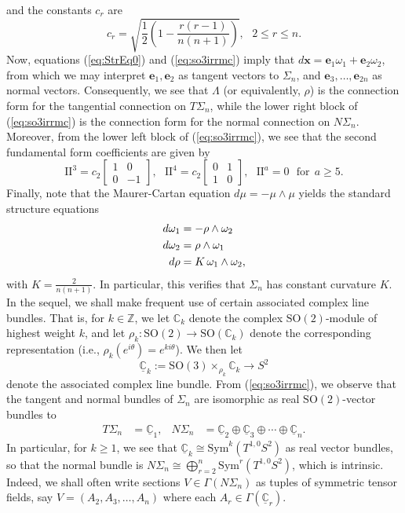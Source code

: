 \documentclass[11pt]{article}
\newcommand{\SO}{\mathrm{SO}}
\newcommand{\Sym}{\mathrm{Sym}}
\newcommand{\Z}{\mathbb{Z}}
\newcommand{\C}{\mathbb{C}}
\newcommand{\uC}{\underline{\mathbb{C}}}
\newcommand{\sff}{\mathrm{I\!I}}
\theoremstyle{definition}
\numberwithin{equation}{section}
\begin{document}
and the constants $c_r$  are
\begin{equation*}
    c_r = \sqrt{\frac{1}{2} \left( 1 - \frac{r(r-1)}{n(n+1)}  \right)}, \ \ \ 2 \leq r \leq n.
\end{equation*}
\indent Now, equations (\ref{eq:StrEq0}) and (\ref{eq:so3irrmc}) imply that $d\mathbf{x} = \mathbf{e}_1\omega_1 + \mathbf{e}_2\omega_2$, from which we may interpret $\mathbf{e}_1, \mathbf{e}_2$ as tangent vectors to $\Sigma_n$, and $\mathbf{e}_3, \ldots, \mathbf{e}_{2n}$ as normal vectors.  Consequently, we see that $\Lambda$ (or equivalently, $\rho$) is the connection form for the tangential connection on $T\Sigma_n$, while the lower right block of (\ref{eq:so3irrmc}) is the connection form for the normal connection on $N\Sigma_n$.  Moreover, from the lower left block of (\ref{eq:so3irrmc}), we see that the second fundamental form coefficients are given by
\begin{equation} \label{eq:SFF}
    \sff^3 = c_2 \begin{bmatrix}
        1 & 0 \\
        0 & - 1
    \end{bmatrix}, \:\:\: \sff^4 = c_2 \begin{bmatrix}
        0 & 1 \\
        1 & 0
    \end{bmatrix}, \:\:\: \sff^a = 0 \:\:\: \text{for} \:\: a \geq 5.
\end{equation}
Finally, note that the Maurer-Cartan equation $d\mu = -\mu \wedge \mu$ yields the standard structure equations
\begin{align} \label{eq:StrEq1}
d\omega_1 & = -\rho \wedge \omega_2  \notag \\
d\omega_2 & = \rho \wedge \omega_1 \\
d\rho & = K\,\omega_1 \wedge \omega_2, \notag
\end{align}
with $K = \frac{2}{n(n+1)}$.  In particular, this verifies that $\Sigma_n$ has constant curvature $K$. \\

\indent In the sequel, we shall make frequent use of certain associated complex line bundles.  That is, for $k \in \Z$, we let $\C_k$ denote the complex $\SO(2)$-module of highest weight $k$, and let $\rho_k \colon \SO(2) \to \SO(\C_k)$ denote the corresponding representation (i.e., $\rho_k(e^{i\theta}) = e^{ki\theta}$).  We then let
$$\underline{\C}_k := \SO(3) \times_{\rho_k} \C_k \to S^2$$
denote the associated complex line bundle.    From (\ref{eq:so3irrmc}), we observe that the tangent and normal bundles of $\Sigma_n$ are isomorphic as real $\SO(2)$-vector bundles to
\begin{align}
   T \Sigma_n & = \uC_1, &    N \Sigma_n & = \uC_2 \oplus \uC_3 \oplus \cdots \oplus \uC_n. \label{eq:normbundiso}
\end{align}
In particular, for $k \geq 1$, we see that $\uC_k \cong \Sym^k(T^{1,0}S^2)$ as real vector bundles, so that the normal bundle is  $N\Sigma_n \cong \bigoplus_{r = 2}^n \Sym^r(T^{1,0}S^2)$, which is intrinsic.  Indeed, we shall often write sections $V \in \Gamma(N\Sigma_n)$ as tuples of symmetric tensor fields, say $V = (A_2, A_3, \ldots, A_n)$ where each $A_r \in \Gamma(\uC_r)$.
\end{document}
